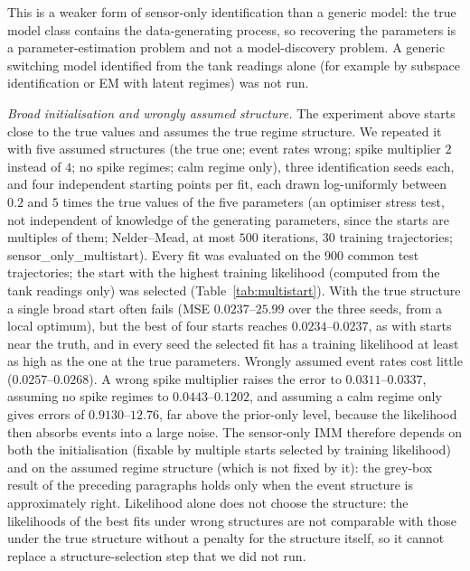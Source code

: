 \documentclass[conference]{IEEEtran}
\begin{document}
This is a weaker form of sensor-only identification than a generic model: the true model class contains the data-generating process, so recovering the parameters is a parameter-estimation problem and not a model-discovery problem. A generic switching model identified from the tank readings alone (for example by subspace identification or EM with latent regimes) was not run.

\emph{Broad initialisation and wrongly assumed structure.} The experiment above starts close to the true values and assumes the true regime structure. We repeated it with five assumed structures (the true one; event rates wrong; spike multiplier $2$ instead of $4$; no spike regimes; calm regime only), three identification seeds each, and four independent starting points per fit, each drawn log-uniformly between $0.2$ and $5$ times the true values of the five parameters (an optimiser stress test, not independent of knowledge of the generating parameters, since the starts are multiples of them; Nelder--Mead, at most $500$ iterations, $30$ training trajectories; sensor\_only\_multistart). Every fit was evaluated on the $900$ common test trajectories; the start with the highest training likelihood (computed from the tank readings only) was selected (Table~\ref{tab:multistart}). With the true structure a single broad start often fails (MSE $0.0237$--$25.99$ over the three seeds, from a local optimum), but the best of four starts reaches $0.0234$--$0.0237$, as with starts near the truth, and in every seed the selected fit has a training likelihood at least as high as the one at the true parameters. Wrongly assumed event rates cost little ($0.0257$--$0.0268$). A wrong spike multiplier raises the error to $0.0311$--$0.0337$, assuming no spike regimes to $0.0443$--$0.1202$, and assuming a calm regime only gives errors of $0.9130$--$12.76$, far above the prior-only level, because the likelihood then absorbs events into a large noise. The sensor-only IMM therefore depends on both the initialisation (fixable by multiple starts selected by training likelihood) and on the assumed regime structure (which is not fixed by it): the grey-box result of the preceding paragraphs holds only when the event structure is approximately right. Likelihood alone does not choose the structure: the likelihoods of the best fits under wrong structures are not comparable with those under the true structure without a penalty for the structure itself, so it cannot replace a structure-selection step that we did not run.
\end{document}
